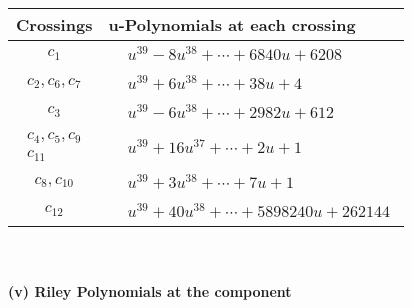 \documentclass[1p]{elsarticle_modified}
\theoremstyle{definition}
\begin{document}
\begin{tabular}{m{50pt}|m{274pt}}
Crossings & \hspace{64pt}u-Polynomials at each crossing \\
\hline $$\begin{aligned}c_{1}\end{aligned}$$&$\begin{aligned}
&u^{39}-8 u^{38}+\cdots+6840 u+6208
\end{aligned}$\\
\hline $$\begin{aligned}c_{2},c_{6},c_{7}\end{aligned}$$&$\begin{aligned}
&u^{39}+6 u^{38}+\cdots+38 u+4
\end{aligned}$\\
\hline $$\begin{aligned}c_{3}\end{aligned}$$&$\begin{aligned}
&u^{39}-6 u^{38}+\cdots+2982 u+612
\end{aligned}$\\
\hline $$\begin{aligned}c_{4},c_{5},c_{9}\\c_{11}\end{aligned}$$&$\begin{aligned}
&u^{39}+16 u^{37}+\cdots+2 u+1
\end{aligned}$\\
\hline $$\begin{aligned}c_{8},c_{10}\end{aligned}$$&$\begin{aligned}
&u^{39}+3 u^{38}+\cdots+7 u+1
\end{aligned}$\\
\hline $$\begin{aligned}c_{12}\end{aligned}$$&$\begin{aligned}
&u^{39}+40 u^{38}+\cdots+5898240 u+262144
\end{aligned}$\\
\hline
\end{tabular}\\~\\
\newpage\renewcommand{\arraystretch}{1}
\flushleft \textbf{(v) Riley Polynomials at the component}\newline \\
\end{document}
